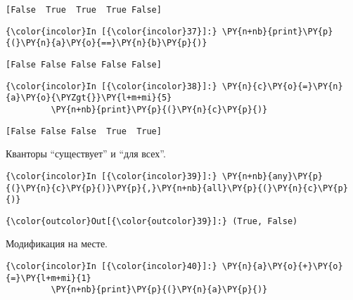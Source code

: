     \begin{Verbatim}[commandchars=\\\{\}]
[False  True  True  True False]

    \end{Verbatim}

    \begin{Verbatim}[commandchars=\\\{\}]
{\color{incolor}In [{\color{incolor}37}]:} \PY{n+nb}{print}\PY{p}{(}\PY{n}{a}\PY{o}{==}\PY{n}{b}\PY{p}{)}
\end{Verbatim}

    \begin{Verbatim}[commandchars=\\\{\}]
[False False False False False]

    \end{Verbatim}

    \begin{Verbatim}[commandchars=\\\{\}]
{\color{incolor}In [{\color{incolor}38}]:} \PY{n}{c}\PY{o}{=}\PY{n}{a}\PY{o}{\PYZgt{}}\PY{l+m+mi}{5}
         \PY{n+nb}{print}\PY{p}{(}\PY{n}{c}\PY{p}{)}
\end{Verbatim}

    \begin{Verbatim}[commandchars=\\\{\}]
[False False False  True  True]

    \end{Verbatim}

    Кванторы ``существует'' и ``для всех''.

    \begin{Verbatim}[commandchars=\\\{\}]
{\color{incolor}In [{\color{incolor}39}]:} \PY{n+nb}{any}\PY{p}{(}\PY{n}{c}\PY{p}{)}\PY{p}{,}\PY{n+nb}{all}\PY{p}{(}\PY{n}{c}\PY{p}{)}
\end{Verbatim}

            \begin{Verbatim}[commandchars=\\\{\}]
{\color{outcolor}Out[{\color{outcolor}39}]:} (True, False)
\end{Verbatim}
        
    Модификация на месте.

    \begin{Verbatim}[commandchars=\\\{\}]
{\color{incolor}In [{\color{incolor}40}]:} \PY{n}{a}\PY{o}{+}\PY{o}{=}\PY{l+m+mi}{1}
         \PY{n+nb}{print}\PY{p}{(}\PY{n}{a}\PY{p}{)}
\end{Verbatim}


